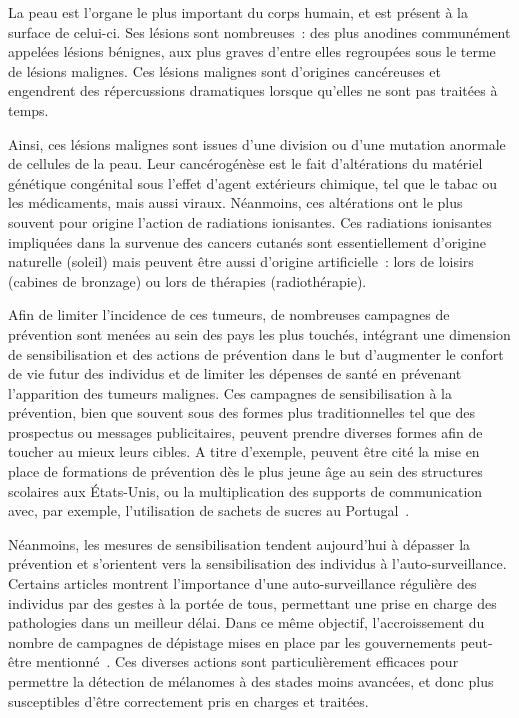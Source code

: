\renewcommand{\thechapter}{\roman{chapter}}
\setcounter{chapter}{1}
\setcounter{figure}{0}

\label{chap:introduction}
La peau est l'organe le plus important du corps humain, et est présent à la surface de celui-ci. Ses lésions sont nombreuses~: des plus anodines communément appelées lésions bénignes, aux plus graves d'entre elles regroupées sous le terme de lésions malignes. Ces lésions malignes sont d'origines cancéreuses et engendrent des répercussions dramatiques lorsque qu'elles ne sont pas traitées à temps.\par

Ainsi, ces lésions malignes sont issues d’une division ou d’une mutation anormale de cellules de la peau. Leur cancérogénèse est le fait d'altérations du matériel génétique congénital sous l'effet d'agent extérieurs chimique, tel que le tabac ou les médicaments, mais aussi viraux. Néanmoins, ces altérations ont le plus souvent pour origine l'action de radiations ionisantes. Ces radiations ionisantes impliquées dans la survenue des cancers cutanés sont essentiellement d'origine naturelle (soleil) mais peuvent être aussi d'origine artificielle~: lors de loisirs (cabines de bronzage) ou lors de thérapies (radiothérapie).\par

Afin de limiter l’incidence de ces tumeurs, de nombreuses campagnes de prévention sont menées au sein des pays les plus touchés, intégrant une dimension de sensibilisation et des actions de prévention dans le but d’augmenter le confort de vie futur des individus et de limiter les dépenses de santé en prévenant l'apparition des tumeurs malignes. Ces campagnes de sensibilisation à la prévention, bien que souvent sous des formes plus traditionnelles tel que des prospectus ou messages publicitaires, peuvent prendre diverses formes afin de toucher au mieux leurs cibles. A titre d’exemple, 
peuvent être cité la mise en place de formations de prévention dès le plus jeune âge au sein des structures scolaires aux États-Unis, ou la multiplication des supports de communication avec, par exemple, l’utilisation de sachets de sucres au Portugal~\cite{Correia2017,Guy2016}.\par 

Néanmoins, les mesures de sensibilisation tendent aujourd’hui à dépasser la prévention et s'orientent vers la sensibilisation des individus à l'auto-surveillance. Certains articles montrent l’importance d’une auto-surveillance régulière des individus par des gestes à la portée de tous, permettant une prise en charge des pathologies dans un meilleur délai. Dans ce même objectif, l’accroissement du nombre de campagnes de dépistage mises en place par les gouvernements peut-être mentionné~\cite{Friedman1985}. Ces diverses actions sont particulièrement efficaces pour permettre la détection de mélanomes à des stades moins avancées, et donc plus susceptibles d'être correctement pris en charges et traitées.\par

